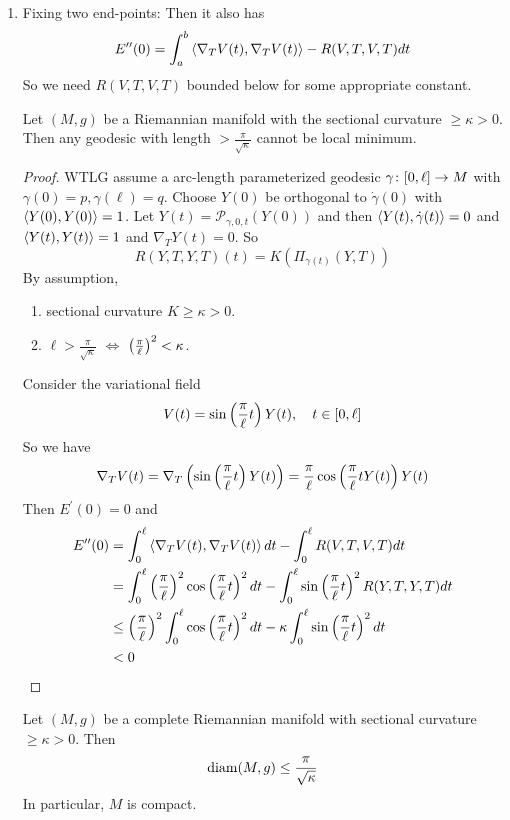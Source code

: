 \begin{enumerate}[label=\Roman{*}.]
	\item Fixing two end-points: Then it also has
	\begin{equation*}
		E^{\prime\prime}(0) = \int_a^b \left\langle \nabla_TV(t),\nabla_TV(t) \right\rangle -R(V,T,V,T)dt
	\end{equation*}
	So we need $R(V,T,V,T)$ bounded below for some appropriate constant.
	\begin{lem}
		Let $(M,g)$ be a Riemannian manifold with the sectional curvature $\geq \kappa > 0$. Then any geodesic with length $> \frac{\pi}{\sqrt{\kappa}}$ cannot be local minimum.
	\end{lem}
	\begin{proof}
		WTLG assume a arc-length parameterized geodesic $\gamma \colon [0,\ell] \rightarrow M$ with $\gamma(0) = p, \gamma(\ell) = q$. Choose $Y(0)$ be orthogonal to $\dot{\gamma}(0)$ with $\left\langle Y(0),Y(0) \right\rangle = 1$. Let $Y(t) = \mathcal{P}_{\gamma,0,t}(Y(0))$ and then $\left\langle Y(t),\dot{\gamma}(t) \right\rangle = 0$ and $\left\langle Y(t),Y(t) \right\rangle = 1$ and $\nabla_TY(t) = 0$. So
		\begin{equation*}
			R(Y,T,Y,T)(t) = K(\Pi_{\gamma(t)}(Y,T))
		\end{equation*}
		By assumption,
		\begin{enumerate}[label=(\roman{*})]
			\item sectional curvature $K \geq \kappa > 0$.
			\item $\ell > \frac{\pi}{\sqrt{\kappa}}$ $\Leftrightarrow$ $\left(\frac{\pi}{\ell}\right)^2 < \kappa$.
		\end{enumerate}

		Consider the variational field
		\begin{equation*}
			V(t) = \sin\left(\frac{\pi}{\ell}t\right)Y(t),\quad t \in [0,\ell]
		\end{equation*}
		So we have 
		\begin{equation*}
			\nabla_TV(t) = \nabla_T\left(\sin\left(\frac{\pi}{\ell}t\right)Y(t)\right) = \frac{\pi}{\ell}\cos\left(\frac{\pi}{\ell}tY(t)\right)Y(t)
		\end{equation*}
		Then $E^\prime(0) = 0$ and
		\begin{equation*}
			\begin{aligned}
				E^{\prime\prime}(0) &= \int_0^\ell \left\langle \nabla_TV(t),\nabla_TV(t) \right\rangle dt - \int_0^\ell R(V,T,V,T)dt \\
				&= \int_0^\ell \left(\frac{\pi}{\ell}\right)^2\cos\left(\frac{\pi}{\ell}t\right)^2 dt - \int_0^\ell\sin\left(\frac{\pi}{\ell}t\right)^2 R(Y,T,Y,T)dt \\
				&\leq  \left(\frac{\pi}{\ell}\right)^2\int_0^\ell \cos\left(\frac{\pi}{\ell}t\right)^2 dt - \kappa\int_0^\ell\sin\left(\frac{\pi}{\ell}t\right)^2 dt \\
				& < 0
			\end{aligned}
		\end{equation*}
	\end{proof}
	\begin{cor}
		Let $(M,g)$ be a complete Riemannian manifold with sectional curvature $\geq \kappa > 0$. Then
		\begin{equation*}
			\operatorname{diam}(M,g) \leq \frac{\pi}{\sqrt{\kappa}}
		\end{equation*}
		In particular, $M$ is compact.
	\end{cor}


\end{enumerate}
